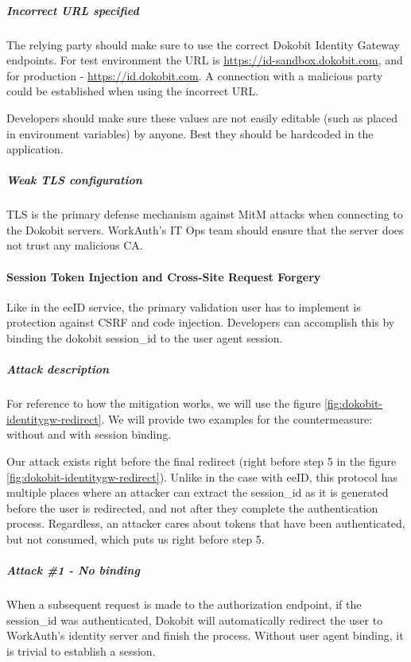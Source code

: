 \subparagraph{Incorrect URL specified}

The relying party should make sure to use the correct Dokobit Identity Gateway endpoints. For test environment the URL is \url{https://id-sandbox.dokobit.com}, and for production - \url{https://id.dokobit.com}. A connection with a malicious party could be established when using the incorrect URL.

Developers should make sure these values are not easily editable (such as placed in environment variables) by anyone. Best they should be hardcoded in the application.

\subparagraph{Weak TLS configuration}

TLS is the primary defense mechanism against MitM attacks when connecting to the Dokobit servers. WorkAuth's IT Ops team should ensure that the server does not trust any malicious CA.

\paragraph{Session Token Injection and Cross-Site Request Forgery}

Like in the eeID service, the primary validation user has to implement is protection against CSRF and code injection. Developers can accomplish this by binding the dokobit session\_id to the user agent session.

\subparagraph{Attack description}

For reference to how the mitigation works, we will use the figure \ref{fig:dokobit-identitygw-redirect}. We will provide two examples for the countermeasure: without and with session binding.

Our attack exists right before the final redirect (right before step 5 in the figure \ref{fig:dokobit-identitygw-redirect}). Unlike in the case with eeID, this protocol has multiple places where an attacker can extract the session\_id as it is generated before the user is redirected, and not after they complete the authentication process. Regardless, an attacker cares about tokens that have been authenticated, but not consumed, which puts us right before step 5.

\subparagraph{Attack \#1 - No binding}

When a subsequent request is made to the authorization endpoint, if the session\_id was authenticated, Dokobit will automatically redirect the user to WorkAuth's identity server and finish the process. Without user agent binding, it is trivial to establish a session.


